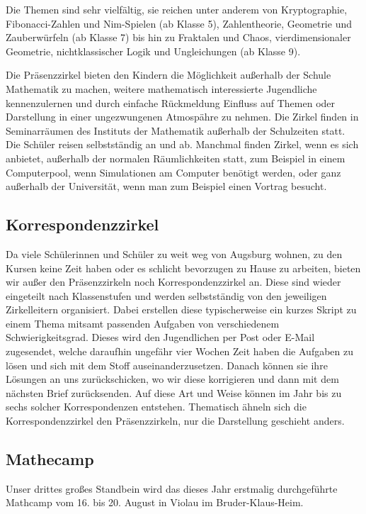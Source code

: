 \documentclass[12pt]{zettel}
\begin{document}
Die Themen sind sehr vielfältig, sie reichen unter anderem von
Kryptographie, Fibonacci-Zahlen und Nim-Spielen (ab Klasse 5),
Zahlentheorie, Geometrie und Zauberwürfeln (ab Klasse 7) bis hin zu
Fraktalen und Chaos, vierdimensionaler Geometrie, nichtklassischer Logik
und Ungleichungen (ab Klasse 9).

Die Präsenzzirkel bieten den Kindern die Möglichkeit außerhalb der
Schule Mathematik zu machen, weitere mathematisch interessierte
Jugendliche kennenzulernen und durch einfache Rückmeldung Einfluss auf
Themen oder Darstellung in einer ungezwungenen Atmospähre zu nehmen. Die
Zirkel finden in Seminarräumen des Instituts der Mathematik außerhalb
der Schulzeiten statt. Die Schüler reisen selbstständig an und ab.
Manchmal finden Zirkel, wenn es sich anbietet, außerhalb der normalen
Räumlichkeiten statt, zum Beispiel in einem Computerpool, wenn
Simulationen am Computer benötigt werden, oder ganz außerhalb der
Universität, wenn man zum Beispiel einen Vortrag besucht.

\subsection{Korrespondenzzirkel}

Da viele Schülerinnen und Schüler zu weit weg von Augsburg wohnen, zu
den Kursen keine Zeit haben oder es schlicht bevorzugen zu Hause zu
arbeiten, bieten wir außer den Präsenzzirkeln noch Korrespondenzzirkel
an. Diese sind wieder eingeteilt nach Klassenstufen und werden
selbstständig von den jeweiligen Zirkelleitern organisiert. Dabei
erstellen diese typischerweise ein kurzes Skript zu einem Thema mitsamt
passenden Aufgaben von verschiedenem Schwierigkeitsgrad. Dieses wird den
Jugendlichen per Post oder E-Mail zugesendet, welche daraufhin ungefähr
vier Wochen Zeit haben die Aufgaben zu lösen und sich mit dem Stoff
auseinanderzusetzen. Danach können sie ihre Lösungen an uns
zurückschicken, wo wir diese korrigieren und dann mit dem nächsten Brief
zurücksenden. Auf diese Art und Weise können im Jahr bis zu sechs
solcher Korrespondenzen entstehen. Thematisch ähneln sich die
Korrespondenzzirkel den Präsenzzirkeln, nur die Darstellung geschieht
anders.

\subsection{Mathecamp}

Unser drittes großes Standbein wird das dieses Jahr erstmalig
durchgeführte Mathcamp vom 16. bis 20. August in Violau im
Bruder-Klaus-Heim.
\end{document}
